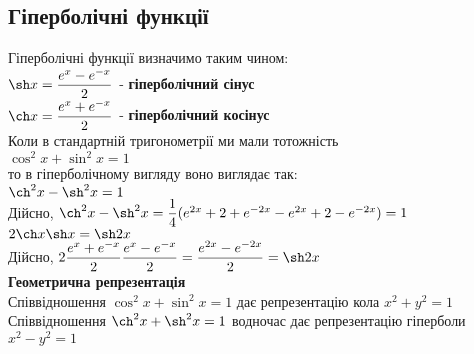 \documentclass[a4paper, 14pt]{extarticle}
\def\bigline{\vspace{5mm}\\}
\theoremstyle{theoremdd}
\theoremstyle{theoremdd}
\theoremstyle{theoremdd}
\theoremstyle{theoremdd}
\theoremstyle{theoremdd}
\theoremstyle{theoremdd}
\theoremstyle{theoremdd}
\theoremstyle{theoremdd}
\begin{document}
\subsection{Гіперболічні функції}
Гіперболічні функції визначимо таким чином:\\
$\sh x = \dfrac{e^x - e^{-x}}{2}$ - \textbf{гіперболічний сінус} \\
$\ch x = \dfrac{e^x + e^{-x}}{2}$ - \textbf{гіперболічний косінус}
\bigline
Коли в стандартній тригонометрії ми мали тотожність\\
$\cos ^2 x + \sin^2 x = 1$\\
то в гіперболічному вигляду воно виглядає так:\\
$\ch ^2 x - \sh ^2 x = 1$\\
Дійсно, $\ch ^2 x - \sh ^2 x = \dfrac{1}{4}(e^{2x} + 2 + e^{-2x} - e^{2x} + 2 - e^{-2x}) = 1$
\bigline
$2 \ch x \sh x = \sh 2x$\\
Дійсно, $2 \dfrac{e^x + e^{-x}}{2} \dfrac{e^x - e^{-x}}{2} = \dfrac{e^{2x}-e^{-2x}}{2} = \sh 2x$
\bigline
\textbf{Геометрична репрезентація}\\
Співвідношення $\cos ^2 x + \sin^2 x = 1$ дає репрезентацію кола $x^2+y^2=1$\\
Співвідношення $\ch ^2 x + \sh^2 x = 1$ водночас дає репрезентацію гіперболи $x^2-y^2=1$
\begin{center}
\qquad
{}
\end{center}
\end{document}
